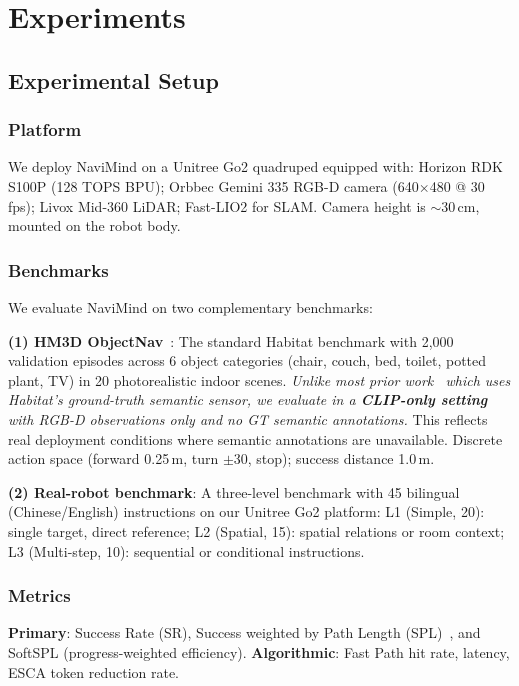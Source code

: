 \documentclass[conference]{IEEEtran}
\begin{document}
\section{Experiments}
\label{sec:experiments}

\subsection{Experimental Setup}

\subsubsection{Platform}

We deploy NaviMind on a Unitree Go2 quadruped equipped with:
Horizon RDK S100P (128 TOPS BPU);
Orbbec Gemini 335 RGB-D camera (640$\times$480 @ 30\,fps);
Livox Mid-360 LiDAR;
Fast-LIO2 for SLAM.
Camera height is $\sim$30\,cm, mounted on the robot body.

\subsubsection{Benchmarks}

We evaluate NaviMind on two complementary benchmarks:

\textbf{(1) HM3D ObjectNav}~\cite{yadav2022hm3d}: The standard Habitat benchmark with 2,000 validation episodes across 6 object categories (chair, couch, bed, toilet, potted plant, TV) in 20 photorealistic indoor scenes.
\emph{Unlike most prior work~\cite{sgnav2024, vlfm2024} which uses Habitat's ground-truth semantic sensor, we evaluate in a \textbf{CLIP-only setting} with RGB-D observations only and no GT semantic annotations.}
This reflects real deployment conditions where semantic annotations are unavailable.
Discrete action space (forward 0.25\,m, turn $\pm$30\textdegree, stop); success distance 1.0\,m.

\textbf{(2) Real-robot benchmark}: A three-level benchmark with 45 bilingual (Chinese/English) instructions on our Unitree Go2 platform:
L1 (Simple, 20): single target, direct reference;
L2 (Spatial, 15): spatial relations or room context;
L3 (Multi-step, 10): sequential or conditional instructions.

\subsubsection{Metrics}

\textbf{Primary}: Success Rate (SR), Success weighted by Path Length (SPL)~\cite{batra2020objectnav, anderson2018eval}, and SoftSPL (progress-weighted efficiency).
\textbf{Algorithmic}: Fast Path hit rate, latency, ESCA token reduction rate.
\end{document}
